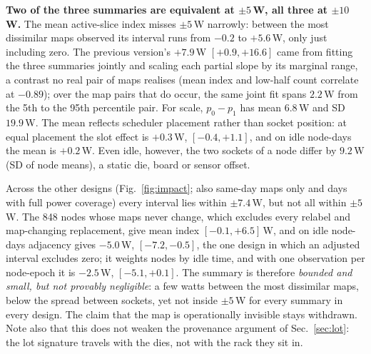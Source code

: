 \documentclass[10pt,conference]{IEEEtran}
\begin{document}
\textbf{Two of the three summaries are equivalent at $\pm5$\,W, all three at $\pm10$\,W.}
The mean active-slice index misses $\pm5$\,W narrowly: between the most dissimilar maps
observed its interval runs from $-0.2$ to $+5.6$\,W, only just including zero. The previous
version's $+7.9$\,W $[+0.9,+16.6]$ came from fitting the three summaries jointly and scaling each
partial slope by its marginal range, a contrast no real pair of maps realises (mean index and
low-half count correlate at $-0.89$); over the map pairs that do occur, the same joint fit spans
$2.2$\,W from the 5th to the 95th percentile pair. For scale, $p_0-p_1$ has mean $6.8$\,W and SD
$19.9$\,W. The mean reflects scheduler placement rather than socket position: at equal placement
the slot effect is $+0.3$\,W, $[-0.4,+1.1]$, and on idle node-days the mean is $+0.2$\,W. Even
idle, however, the two sockets of a node differ by $9.2$\,W (SD of node means), a static die,
board or sensor offset.

Across the other designs (Fig.~\ref{fig:impact}; also same-day maps only and days with full
power coverage) every interval lies within $\pm7.4$\,W, but not all within $\pm5$\,W. The 848
nodes whose maps never change, which excludes every relabel and map-changing replacement, give
mean index $[-0.1,+6.5]$\,W, and on idle node-days adjacency gives $-5.0$\,W, $[-7.2,-0.5]$, the one design
in which an adjusted interval excludes zero; it weights nodes by idle time, and with one
observation per node-epoch it is $-2.5$\,W, $[-5.1,+0.1]$. The summary is therefore
\emph{bounded and small, but not provably negligible}: a few watts between the most dissimilar
maps, below the spread between sockets, yet not inside $\pm5$\,W for every summary in every
design. The claim that the map is operationally invisible stays withdrawn. Note also that this does not weaken
the provenance argument of Sec.~\ref{sec:lot}: the lot signature travels with the dies, not
with the rack they sit in.
\end{document}
